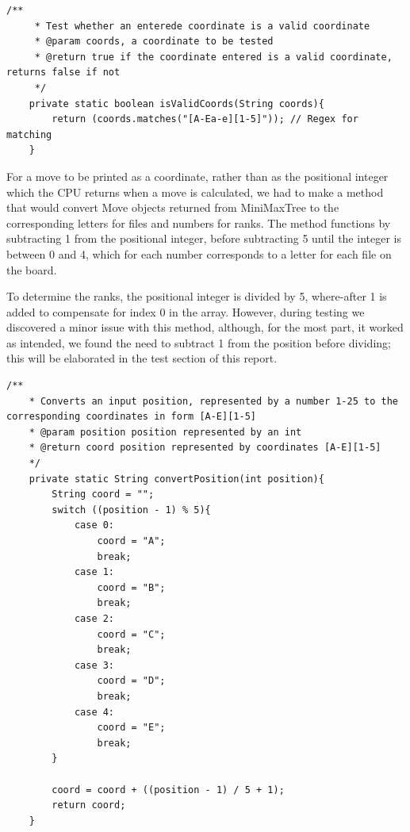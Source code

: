 \documentclass[12pt, a4paper]{article}
\begin{document}
\begin{lstlisting}[style=JavaStyle]
    /**
     * Test whether an enterede coordinate is a valid coordinate
     * @param coords, a coordinate to be tested
     * @return true if the coordinate entered is a valid coordinate, returns false if not
     */
    private static boolean isValidCoords(String coords){
        return (coords.matches("[A-Ea-e][1-5]")); // Regex for matching
    }
\end{lstlisting}
\vspace{10mm}
For a move to be printed as a coordinate, rather than as the positional integer which the CPU returns when a move is calculated, we had to make a method that would convert Move objects returned from MiniMaxTree to the corresponding letters for files and numbers for ranks. The method functions by subtracting 1 from the positional integer, before subtracting 5 until the integer is between 0 and 4, which for each number corresponds to a letter for each file on the board.

To determine the ranks, the positional integer is divided by 5, where-after 1 is added to compensate for index 0 in the array.
However, during testing we discovered a minor issue with this method, although, for the most part, it worked as intended, we found the need to subtract 1 from the position before dividing; this will be elaborated in the test section of this report.

\begin{lstlisting}[style=JavaStyle]
    /**
    * Converts an input position, represented by a number 1-25 to the corresponding coordinates in form [A-E][1-5]
    * @param position position represented by an int
    * @return coord position represented by coordinates [A-E][1-5]
    */
    private static String convertPosition(int position){
        String coord = "";
        switch ((position - 1) % 5){
            case 0:
                coord = "A";
                break;
            case 1:
                coord = "B";
                break;
            case 2:
                coord = "C";
                break;
            case 3:
                coord = "D";
                break;
            case 4:
                coord = "E";
                break;
        }

        coord = coord + ((position - 1) / 5 + 1);
        return coord;
    }
\end{lstlisting}
\vspace{10mm}

\newpage
\end{document}

